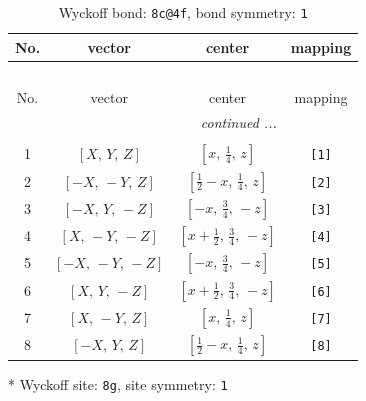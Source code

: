 \documentclass[fleqn,8pt]{jsarticle}
\begin{document}
\renewcommand{\arraystretch}{1.2}
\begin{longtable}{cccc}
\caption{Wyckoff bond: {\tt 8c@4f}, bond symmetry: {\tt 1}}
 \\
 \hline \hline
No. & vector & center & mapping \\ \hline \endfirsthead

\multicolumn{3}{l}{\tablename\ \thetable{}} \\
 \hline \hline
No. & vector & center & mapping \\ \hline \endhead

 \hline \hline
\multicolumn{3}{r}{\footnotesize\it continued ...} \\ \endfoot

 \hline \hline
\multicolumn{3}{r}{} \\ \endlastfoot

1 & $\left[ X,\, Y,\, Z \right]$ & $\left[ x,\, \frac{1}{4},\, z \right]$ & {\tt [1]} \\ \hline
2 & $\left[ - X,\, - Y,\, Z \right]$ & $\left[ \frac{1}{2} - x,\, \frac{1}{4},\, z \right]$ & {\tt [2]} \\ \hline
3 & $\left[ - X,\, Y,\, - Z \right]$ & $\left[ - x,\, \frac{3}{4},\, - z \right]$ & {\tt [3]} \\ \hline
4 & $\left[ X,\, - Y,\, - Z \right]$ & $\left[ x + \frac{1}{2},\, \frac{3}{4},\, - z \right]$ & {\tt [4]} \\ \hline
5 & $\left[ - X,\, - Y,\, - Z \right]$ & $\left[ - x,\, \frac{3}{4},\, - z \right]$ & {\tt [5]} \\ \hline
6 & $\left[ X,\, Y,\, - Z \right]$ & $\left[ x + \frac{1}{2},\, \frac{3}{4},\, - z \right]$ & {\tt [6]} \\ \hline
7 & $\left[ X,\, - Y,\, Z \right]$ & $\left[ x,\, \frac{1}{4},\, z \right]$ & {\tt [7]} \\ \hline
8 & $\left[ - X,\, Y,\, Z \right]$ & $\left[ \frac{1}{2} - x,\, \frac{1}{4},\, z \right]$ & {\tt [8]} \\
\end{longtable}
* Wyckoff site: {\tt 8g}, site symmetry: {\tt 1}
\renewcommand{\arraystretch}{1.2}
\end{document}

